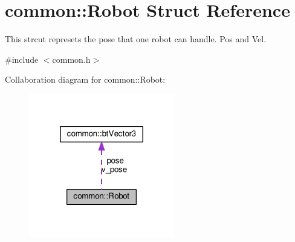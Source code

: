 \hypertarget{structcommon_1_1Robot}{\section{common\-:\-:Robot Struct Reference}
\label{structcommon_1_1Robot}
}


This strcut represets the pose that one robot can handle. Pos and Vel.  




{\ttfamily \#include $<$common.\-h$>$}



Collaboration diagram for common\-:\-:Robot\-:
\nopagebreak
\begin{figure}[H]
\begin{center}
\leavevmode
\includegraphics[width=180pt]{structcommon_1_1Robot__coll__graph}
\end{center}
\end{figure}

